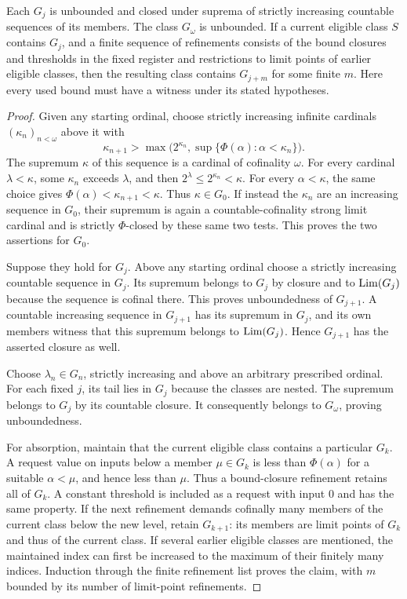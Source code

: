 \begin{lemma}
\label{close:absorption}
Each $G_j$ is unbounded and closed under suprema of strictly increasing
countable sequences of its members.  The class $G_\omega$ is unbounded.
If a current eligible class $S$ contains $G_j$, and a finite sequence of
refinements consists of the bound closures and thresholds in the fixed
register and restrictions to limit points of earlier eligible classes,
then the resulting class contains $G_{j+m}$ for some finite $m$.
Here every used bound must have a witness under its stated hypotheses.
\end{lemma}

\begin{proof}
Given any starting ordinal, choose strictly increasing infinite cardinals
$(\kappa_n)_{n<\omega}$ above it with
\[
 \kappa_{n+1}>
 \max\bigl(2^{\kappa_n},
                \sup\{\Phi(\alpha):\alpha<\kappa_n\}\bigr).
\]
The supremum $\kappa$ of this sequence is a cardinal of cofinality
$\omega$.  For every cardinal $\lambda<\kappa$, some $\kappa_n$ exceeds
$\lambda$, and then $2^\lambda\le2^{\kappa_n}<\kappa$.  For every
$\alpha<\kappa$, the same choice gives
$\Phi(\alpha)<\kappa_{n+1}<\kappa$.  Thus $\kappa\in G_0$.
If instead the $\kappa_n$ are an increasing sequence in $G_0$, their
supremum is again a countable-cofinality strong limit cardinal and is
strictly $\Phi$-closed by these same two tests.  This proves the two
assertions for $G_0$.

Suppose they hold for $G_j$.  Above any starting ordinal choose a strictly
increasing countable sequence in $G_j$.  Its supremum belongs to $G_j$
by closure and to $\operatorname{Lim}(G_j)$ because the sequence is cofinal there.
This proves unboundedness of $G_{j+1}$.  A countable increasing sequence
in $G_{j+1}$ has its supremum in $G_j$, and its own members witness that
this supremum belongs to $\operatorname{Lim}(G_j)$.  Hence $G_{j+1}$ has the asserted
closure as well.

Choose $\lambda_n\in G_n$, strictly increasing and above an arbitrary
prescribed ordinal.  For each fixed $j$, its tail lies in $G_j$ because
the classes are nested.  The supremum belongs to $G_j$ by its countable
closure.  It consequently belongs to $G_\omega$, proving unboundedness.

For absorption, maintain that the current eligible class contains a
particular $G_k$.  A request value on inputs below a member $\mu\in G_k$
is less than $\Phi(\alpha)$ for a suitable $\alpha<\mu$, and hence less
than $\mu$.  Thus a bound-closure refinement retains all of $G_k$.
A constant threshold is included as a request with input $0$ and has
the same property.  If the next refinement demands cofinally many
members of the current class below the new level, retain $G_{k+1}$:
its members are limit points of $G_k$ and thus of the current class.
If several earlier eligible classes are mentioned, the maintained
index can first be increased to the maximum of their finitely many
indices.  Induction through the finite refinement list proves the
claim, with $m$ bounded by its number of limit-point refinements.
\end{proof}

